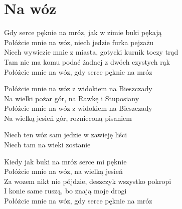 \section{Na wóz}
\begin{text}
\small{Gdy serce pęknie na mróz, jak w zimie buki pękają\\
Połóżcie mnie na wóz, niech jedzie furka pejzażu\\
Niech wywiezie mnie z miasta, gotycki kurnik toczy trąd\\
Tam nie ma komu podać żadnej z dwóch czystych rąk\\
Połóżcie mnie na wóz, gdy serce pęknie na mróz

Połóżcie mnie na wóz z widokiem na Bieszczady\\
Na wielki pożar gór, na Rawkę i Stuposiany\\
Połóżcie mnie na wóz z widokiem na Bieszczady\\
Na wielką jesień gór, roznieconą pisaniem

Niech ten wóz sam jedzie w zawieję liści\\
Niech tam na wieki zostanie

Kiedy jak buki na mróz serce mi pęknie\\
Połóżcie mnie na wóz, na wielką jesień\\
Za wozem nikt nie pójdzie, deszczyk wszystko pokropi\\
I konie same ruszą, bo znają moje drogi\\
Połóżcie mnie na wóz, gdy serce pęknie na mróz}
\end{text}